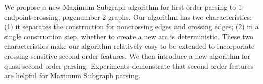 We propose a new Maximum Subgraph algorithm for first-order parsing to 1-endpoint-crossing, pagenumber-2 graphs. Our algorithm has two characteristics: (1) it separates the construction for noncrossing edges and crossing edges; (2) in a single construction step, whether to create a new arc is deterministic. These two characteristics make our algorithm relatively easy to be extended to incorporiate crossing-sensitive second-order features. We then introduce a new algorithm for quasi-second-order parsing. Experiments demonstrate that second-order features are helpful for Maximum Subgraph parsing.
